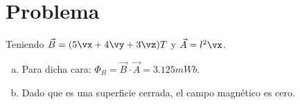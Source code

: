 \section*{Problema}
Teniendo $\vec{B} = (5\vx + 4\vy + 3\vz)T$ y $\vec{A} = l^2 \vx$.
\begin{enumerate}[a)]
	\item Para dicha cara: $\Phi _B = \vec{B} \cdot \vec{A} = \boxed{3.125mWb}$.
	\item Dado que es una superficie cerrada, el campo magnético es cero.
\end{enumerate}




